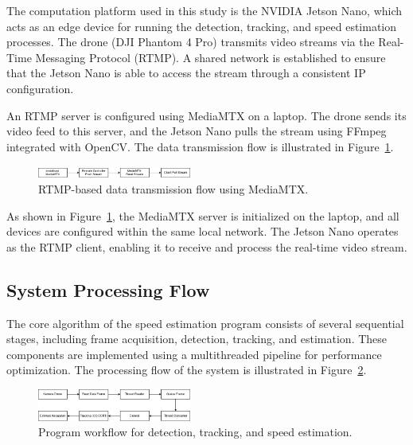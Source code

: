 The computation platform used in this study is the NVIDIA Jetson Nano, which acts as an edge device for running the detection, tracking, and speed estimation processes. The drone (DJI Phantom 4 Pro) transmits video streams via the Real-Time Messaging Protocol (RTMP). A shared network is established to ensure that the Jetson Nano is able to access the stream through a consistent IP configuration.

An RTMP server is configured using MediaMTX on a laptop. The drone sends its video feed to this server, and the Jetson Nano pulls the stream using FFmpeg integrated with OpenCV. The data transmission flow is illustrated in Figure~\ref{fig:alurdata}.

\begin{figure}[H]
    \centering
    \includegraphics[width=0.45\textwidth]{gambar/pengirimandata.jpg}
    \caption{RTMP-based data transmission flow using MediaMTX.}
    \label{fig:alurdata}
\end{figure}

As shown in Figure~\ref{fig:alurdata}, the MediaMTX server is initialized on the laptop, and all devices are configured within the same local network. The Jetson Nano operates as the RTMP client, enabling it to receive and process the real-time video stream.

\subsection{System Processing Flow}

The core algorithm of the speed estimation program consists of several sequential stages, including frame acquisition, detection, tracking, and estimation. These components are implemented using a multithreaded pipeline for performance optimization. The processing flow of the system is illustrated in Figure~\ref{fig:diagramproses}.

\begin{figure}[H]
    \centering
    \includegraphics[width=0.45\textwidth]{gambar/algoritma.jpg}
    \caption{Program workflow for detection, tracking, and speed estimation.}
    \label{fig:diagramproses}
\end{figure}

